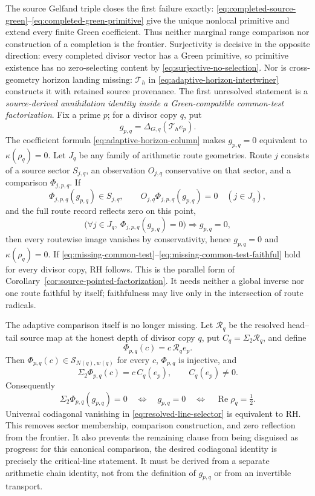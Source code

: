 \documentclass[11pt]{article}
\theoremstyle{definition}
\theoremstyle{remark}
\newcommand{\Rea}{\operatorname{Re}}
\begin{document}
The source Gelfand triple closes the first failure exactly:
\eqref{eq:completed-source-green}--\eqref{eq:completed-green-primitive}
give the unique nonlocal primitive and extend every finite Green coefficient.
Thus neither marginal range comparison nor construction of a completion is
the frontier.  Surjectivity is decisive in the opposite direction: every
completed divisor vector has a Green primitive, so primitive existence has
no zero-selecting content by \eqref{eq:surjective-no-selection}.  Nor is
cross-geometry horizon landing missing: \(\mathcal T_h\) in
\eqref{eq:adaptive-horizon-intertwiner} constructs it with retained source
provenance.  The first unresolved statement is a \emph{source-derived
annihilation identity inside a Green-compatible common-test
factorization}.  Fix a prime \(p\); for a divisor copy \(q\), put
\[
 g_{p,q}=\Delta_{G,q}(\mathcal T_he_p).
\]
The coefficient formula \eqref{eq:adaptive-horizon-column} makes
\(g_{p,q}=0\) equivalent to \(\kappa(\rho_q)=0\).  Let \(J_q\) be any
family of arithmetic route geometries.  Route \(j\) consists of a source
sector \(S_{j,q}\), an observation \(O_{j,q}\) conservative on that sector,
and a comparison \(\Phi_{j,p,q}\).  If
\[
 \Phi_{j,p,q}(g_{p,q})\in S_{j,q},\qquad
 O_{j,q}\Phi_{j,p,q}(g_{p,q})=0
 \quad(j\in J_q),
\tag{7.17a}\label{eq:missing-common-test}
\]
and the full route record reflects zero on this point,
\[
 \bigl(\forall j\in J_q,\ \Phi_{j,p,q}(g_{p,q})=0\bigr)
       \Longrightarrow g_{p,q}=0,
\tag{7.17b}\label{eq:missing-common-test-faithful}
\]
then every routewise image vanishes by conservativity, hence
\(g_{p,q}=0\) and \(\kappa(\rho_q)=0\).  If
\eqref{eq:missing-common-test}--\eqref{eq:missing-common-test-faithful} hold
for every divisor copy, RH follows.  This is the parallel form of
Corollary~\ref{cor:source-pointed-factorization}.  It needs neither a global
inverse nor one route faithful by itself; faithfulness may live only in the
intersection of route radicals.

The adaptive comparison itself is no longer missing.  Let
\(\mathcal R_q\) be the resolved head--tail source map at the honest depth
of divisor copy \(q\), put \(C_q=\Sigma_2\mathcal R_q\), and define
\[
                  \Phi_{p,q}(c)=c\,\mathcal R_qe_p .
\tag{7.17c}\label{eq:resolved-line-comparison}
\]
Then \(\Phi_{p,q}(c)\in\mathcal S_{N(q),w(q)}\) for every \(c\),
\(\Phi_{p,q}\) is injective, and
\[
       \Sigma_2\Phi_{p,q}(c)=c\,C_q(e_p),\qquad C_q(e_p)\ne0.
\tag{7.17d}\label{eq:resolved-line-codiagonal}
\]
Consequently
\[
 \Sigma_2\Phi_{p,q}(g_{p,q})=0
 \quad\Longleftrightarrow\quad g_{p,q}=0
 \quad\Longleftrightarrow\quad \Rea\rho_q=\tfrac12.
\tag{7.17e}\label{eq:resolved-line-selector}
\]
Universal codiagonal vanishing in \eqref{eq:resolved-line-selector} is
equivalent to RH.  This removes sector membership, comparison construction,
and zero reflection from the frontier.  It also prevents the remaining
clause from being disguised as progress: for this canonical comparison, the
desired codiagonal identity is precisely the critical-line statement.  It
must be derived from a separate arithmetic chain identity, not from the
definition of \(g_{p,q}\) or from an invertible transport.
\end{document}
